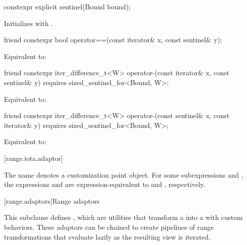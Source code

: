 \begin{itemdecl}
constexpr explicit sentinel(Bound bound);
\end{itemdecl}

\begin{itemdescr}
\pnum
\effects Initializes  with .
\end{itemdescr}

\begin{itemdecl}
friend constexpr bool operator==(const iterator& x, const sentinel& y);
\end{itemdecl}

\begin{itemdescr}
\pnum
\effects Equivalent to: 
\end{itemdescr}

\begin{itemdecl}
friend constexpr iter_difference_t<W> operator-(const iterator& x, const sentinel& y)
  requires sized_sentinel_for<Bound, W>;
\end{itemdecl}

\begin{itemdescr}
\pnum
\effects Equivalent to: 
\end{itemdescr}

\begin{itemdecl}
friend constexpr iter_difference_t<W> operator-(const sentinel& x, const iterator& y)
  requires sized_sentinel_for<Bound, W>;
\end{itemdecl}

\begin{itemdescr}
\pnum
\effects Equivalent to: 
\end{itemdescr}

[range.iota.adaptor]{}

\pnum
The name  denotes a
customization point object.
For some subexpressions  and , the expressions
 and 
are expression-equivalent to
 and , respectively.

[range.adaptors]{Range adaptors}

\pnum
This subclause defines , which are utilities that transform a
 into a  with custom behaviors. These
adaptors can be chained to create pipelines of range transformations that
evaluate lazily as the resulting view is iterated.


